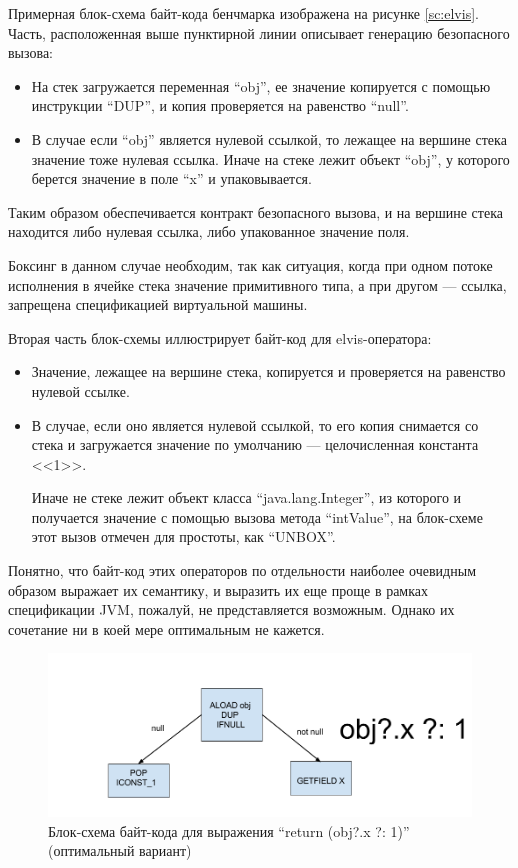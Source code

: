 Примерная блок-схема байт-кода бенчмарка изображена на рисунке \ref{sc:elvis}.
Часть, расположенная выше пунктирной линии описывает генерацию безопасного вызова:
\begin{itemize}
    \item На стек загружается переменная ``obj'', ее значение копируется с помощью инструкции
    ``DUP'', и копия проверяется на равенство ``null''.
    \item В случае если ``obj'' является нулевой ссылкой, то лежащее на вершине стека значение
    тоже нулевая ссылка.
    Иначе на стеке лежит объект ``obj'', у которого берется значение в поле ``x'' и упаковывается.
\end{itemize}

Таким образом обеспечивается контракт безопасного вызова, и на вершине стека находится либо нулевая
ссылка, либо упакованное значение поля.

Боксинг в данном случае необходим, так как ситуация, когда при одном потоке исполнения в ячейке
стека значение примитивного типа, а при другом --- ссылка, запрещена спецификацией виртуальной
машины\cite{JVMSpec}.

Вторая часть блок-схемы иллюстрирует байт-код для elvis-оператора:
\begin{itemize}
    \item Значение, лежащее на вершине стека, копируется и проверяется на равенство нулевой ссылке.
    \item В случае, если оно является нулевой ссылкой, то его копия снимается со стека и
    загружается значение по умолчанию --- целочисленная константа <<1>>.

    Иначе не стеке лежит объект класса ``java.lang.Integer'', из которого и получается значение
    с помощью вызова метода ``intValue'', на блок-схеме этот вызов отмечен для простоты, как
    ``UNBOX''.
\end{itemize}

Понятно, что байт-код этих операторов по отдельности наиболее очевидным образом выражает
их семантику, и выразить их еще проще в рамках спецификации JVM, пожалуй, не представляется
возможным.
Однако их сочетание ни в коей мере оптимальным не кажется.

\begin{figure}
\begin{center}
    \includegraphics[scale=0.4]{../resources/safecall_elvis_optim.png}
\end{center}
\caption{Блок-схема байт-кода для выражения ``return (obj?.x ?: 1)'' (оптимальный вариант)}
\label{sc:elvisOpt}
\end{figure}

